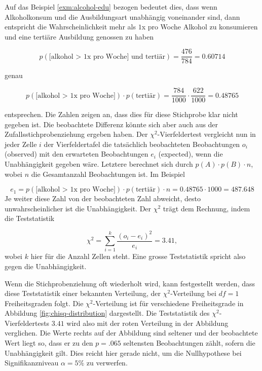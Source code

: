 \documentclass[
]{book}
\theoremstyle{definition}
\theoremstyle{definition}
\theoremstyle{definition}
\theoremstyle{definition}
\theoremstyle{remark}
\begin{document}
Auf das Beispiel \ref{exm:alcohol-edu} bezogen bedeutet dies, dass wenn
Alkoholkonsum und die Ausbildungsart unabhängig voneinander sind, dann
entspricht die Wahrscheinlichkeit mehr als \(1\)x pro Woche Alkohol zu
konsumieren und eine tertiäre Ausbildung genossen zu haben

\[
p(\text{[alkohol > 1x pro Woche] und tertiär}) = \frac{476}{784} = 0.60714
\]

genau

\[
p(\text{[alkohol > 1x pro Woche]}) \cdot p(\text{tertiär}) = \frac{784}{1000}\cdot \frac{622}{1000} = 0.48765
\]

entsprechen. Die Zahlen zeigen an, dass dies für diese Stichprobe klar
nicht gegeben ist. Die beobachtete Differenz könnte sich aber auch aus
der Zufallsstichprobenziehung ergeben haben. Der \(\chi^2\)-Vierfeldertest
vergleicht nun in jeder Zelle \(i\) der Vierfeldertafel die tatsächlich
beobachteten Beobachtungen \(o_i\) (observed) mit den erwarteten
Beobachtungen \(e_i\) (expected), wenn die Unabhängigkeit gegeben wäre.
Letztere berechnet sich durch \(p(A) \cdot p(B) \cdot n\), wobei \(n\) die
Gesamtanzahl Beobachtungen ist. Im Beispiel

\[e_1 = p(\text{[alkohol > 1x pro Woche]}) \cdot p(\text{tertiär}) \cdot n =0.48765 \cdot  1000 = 487.648 \]
Je weiter diese Zahl von der beobachteten Zahl abweicht, desto
unwahrscheinlicher ist die Unabhängigkeit. Der \(\chi^2\) trägt dem
Rechnung, indem die Teststatistik

\[\chi^2 = \sum_{i = 1}^k \frac{(o_i - e_i)^2}{e_i} = 3.41,\]
wobei \(k\) hier für die Anzahl Zellen steht. Eine grosse Teststatistik
spricht also gegen die Unabhängigkeit.

Wenn die Stichprobenziehung oft wiederholt wird, kann festgestellt
werden, dass diese Teststatistik einer bekannten Verteilung, der
\(\chi^2\)-Verteilung bei \(df = 1\) Freiheitsgraden folgt. \label{customdef-chisq-distribution}{Die
\(\chi^2\)-Verteilung ist für verschiedene Freiheitsgrade in Abbildung
\ref{fig:chisq-distribution}
dargestellt.}
Die Teststatistik des \(\chi^2\)-Vierfeldertests
\(3.41\) wird also mit
der roten Verteilung in der Abbildung verglichen. Die Werte rechts auf
der Abbildung sind seltener und der beobachtete Wert liegt so, dass er
zu den \(p = .065\)
seltensten Beobachtungen zählt, sofern die Unabhängigkeit gilt. Dies
reicht hier gerade nicht, um die Nullhypothese bei Signifikanzniveau
\(\alpha = 5\%\) zu verwerfen.
\end{document}
